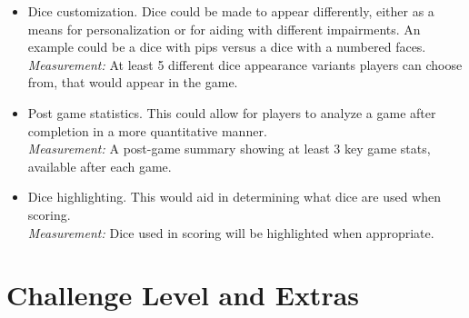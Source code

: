 \documentclass{article}
\begin{document}
\begin{itemize}
	\item Dice customization. Dice could be made to appear differently, either as a means for personalization or for aiding with different impairments. An example could be a dice with pips versus a dice with a numbered faces.\\
	\textit{Measurement:} At least 5 different dice appearance variants players can choose from, that would appear in the game.
	
	\item Post game statistics. This could allow for players to analyze a game after completion in a more quantitative manner.\\
	\textit{Measurement:} A post-game summary showing at least 3 key game stats, available after each game.
	
	\item Dice highlighting. This would aid in determining what dice are used when scoring.\\
	\textit{Measurement:} Dice used in scoring will be highlighted when appropriate.
	
\end{itemize}

\section{Challenge Level and Extras}

\iffalse
\wss{State your expected challenge level (advanced, general or basic).  The
challenge can come through the required domain knowledge, the implementation or
something else.  Usually the greater the novelty of a project the greater its
challenge level.  You should include your rationale for the selected level.
Approval of the level will be part of the discussion with the instructor for
approving the project.  The challenge level, with the approval (or request) of
the instructor, can be modified over the course of the term.}

\wss{Teams may wish to include extras as either potential bonus grades, or to
make up for a less advanced challenge level.  Potential extras include usability
testing, code walkthroughs, user documentation, formal proof, GenderMag
personas, Design Thinking, etc.  Normally the maximum number of extras will be
two.  Approval of the extras will be part of the discussion with the instructor
for approving the project.  The extras, with the approval (or request) of the
instructor, can be modified over the course of the term.}
\fi
\end{document}
